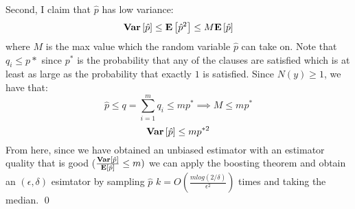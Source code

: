 \documentclass[12pt]{article}
\begin{document}
\begin{solution}
Second, I claim that $\hat{p}$ has low variance:
\[
\mathbf{Var}\left[\hat{p}\right] \leq \mathbf{E}\left[\hat{p}^2\right] \leq M\mathbf{E}\left[\hat{p}\right]
\]
where $M$ is the max value which the random variable $\hat{p}$ can take on. Note that $q_i \leq p*$ since $p^*$ is the probability that any of the clauses are satisfied which is at least as large as the probability that exactly $1$ is satisfied. Since $N(y) \geq 1$, we have that:
\[
\hat{p} \leq q = \sum_{i=1}^{m}{q_i} \leq mp^* \implies M \leq mp^*
\]
\[
\mathbf{Var}\left[\hat{p}\right] \leq mp^{*2}
\]
From here, since we have obtained an unbiased estimator with an estimator quality that is good ($\frac{\mathbf{Var}\left[\hat{p}\right]}{\mathbf{E}\left[\hat{p}\right]} \leq m)$ we can apply the boosting theorem and obtain an $(\epsilon,\delta)$ esimtator by sampling $\hat{p}$ $k = O(\frac{m log(2/\delta)}{\epsilon^2})$ times and taking the median. \qed
\end{solution}
\end{document}
